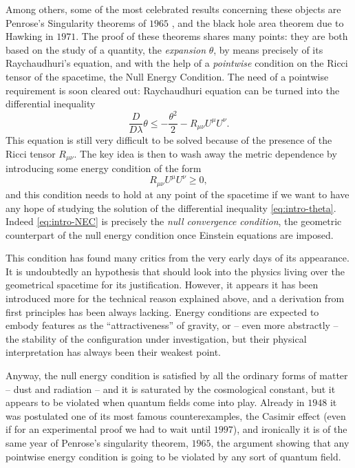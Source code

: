Among others, some of the most celebrated results concerning these objects are Penrose's Singularity theorems of \(1965\) \cite[]{penrose1965gravitational}, and the black hole area theorem due to Hawking \cite[]{hawking1972black} in \(1971\). The proof of these theorems shares many points: they are both based on the study of a quantity, the \emph{expansion} \(\theta\), by means precisely of its Raychaudhuri's equation, and with the help of a \emph{pointwise} condition on the Ricci tensor of the spacetime, the Null Energy Condition. The need of a pointwise requirement is soon cleared out: Raychaudhuri equation can be turned into the differential inequality
\begin{equation}
    \label{eq:intro-theta}
    \frac{D}{D\lambda}\theta \le -\frac{\theta^2}{2} - R_{\mu\nu}U^{\mu}U^{\nu}.
\end{equation}
This equation is still very difficult to be solved because of the presence of the Ricci tensor \(R_{\mu\nu}\). The key idea is then to wash away the metric dependence by introducing some energy condition of the form 
\begin{equation}
    \label{eq:intro-NEC}
    R_{\mu\nu}U^{\mu}U^{\nu}\ge 0,
\end{equation}
and this condition needs to hold at any point of the spacetime if we want to have any hope of studying the solution of the differential inequality \eqref{eq:intro-theta}. Indeed \eqref{eq:intro-NEC} is precisely the \emph{null convergence condition}, the geometric counterpart of the null energy condition once Einstein equations are imposed.

This condition has found many critics from the very early days of its appearance. It is undoubtedly an hypothesis that should look into the physics living over the geometrical spacetime for its justification. However, it appears it has been introduced more for the technical reason explained above, and a derivation from first principles has been always lacking. Energy conditions are expected to embody features as the ``attractiveness'' of gravity, or -- even more abstractly -- the stability of the configuration under investigation, but their physical interpretation has always been their weakest point.

Anyway, the null energy condition is satisfied by all the ordinary forms of matter -- dust and radiation -- and it is saturated by the cosmological constant, but it appears to be violated when quantum fields come into play.
Already in \(1948\) it was postulated one of its most famous counterexamples, the Casimir effect (even if for an experimental proof we had to wait until \(1997\)), and ironically it is of the same year of Penrose's singularity theorem, \(1965\), the argument showing that any pointwise energy condition is going to be violated by any sort of quantum field.

